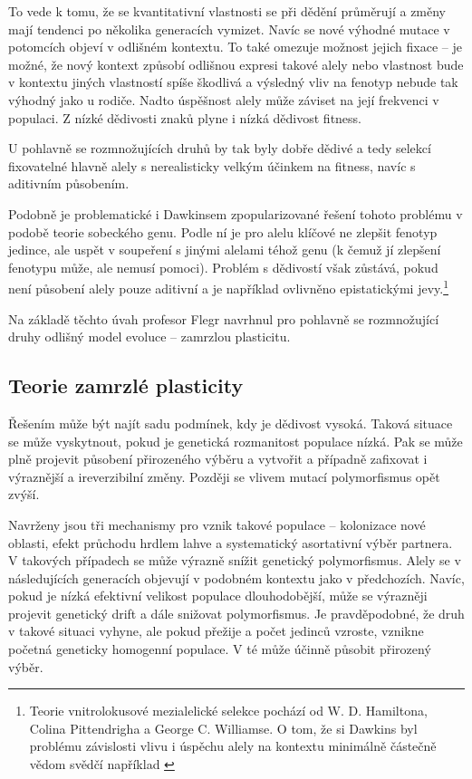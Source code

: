 To vede k tomu, že se kvantitativní vlastnosti se při dědění průměrují a změny mají tendenci po
několika generacích vymizet. Navíc se nové výhodné mutace v potomcích objeví v odlišném kontextu. To také
omezuje možnost jejich fixace -- je možné, že nový kontext způsobí odlišnou expresi takové alely nebo vlastnost bude
v kontextu jiných vlastností spíše škodlivá a výsledný vliv na fenotyp nebude tak výhodný jako u rodiče. Nadto
úspěšnost alely může záviset na její frekvenci v populaci. Z nízké dědivosti znaků plyne i nízká dědivost fitness.

U pohlavně se rozmnožujících druhů by tak byly dobře dědivé a tedy selekcí fixovatelné hlavně alely s nerealisticky
velkým účinkem na fitness, navíc s aditivním působením.

Podobně je problematické i Dawkinsem zpopularizované řešení tohoto problému v podobě teorie sobeckého genu.
Podle ní je pro alelu klíčové ne zlepšit fenotyp jedince, ale uspět v soupeření s jinými alelami téhož genu
(k čemuž jí zlepšení fenotypu může, ale nemusí pomoci). Problém s dědivostí však zůstává, pokud není působení
alely pouze aditivní a je například ovlivněno epistatickými jevy.\footnote{
Teorie vnitrolokusové mezialelické selekce pochází od W. D. Hamiltona, Colina Pittendrigha a George C. Williamse.
O tom, že si Dawkins byl problému závislosti vlivu i úspěchu alely na kontextu minimálně částečně vědom svědčí například
\citet[str. 231]{dawkins2003}
}

Na základě těchto úvah profesor Flegr navrhnul pro pohlavně se rozmnožující druhy odlišný model evoluce -- zamrzlou
plasticitu.

\subsection{Teorie zamrzlé plasticity}

Řešením může být najít sadu podmínek, kdy je dědivost vysoká. Taková situace se může vyskytnout, pokud je genetická
rozmanitost populace nízká. Pak se může plně projevit působení přirozeného výběru a vytvořit a případně zafixovat i
výraznější a ireverzibilní změny. Později se vlivem mutací polymorfismus opět zvýší.

Navrženy jsou tři mechanismy pro vznik takové populace -- kolonizace nové oblasti, efekt průchodu hrdlem lahve a
systematický asortativní výběr partnera. V takových případech se může výrazně snížit genetický polymorfismus. Alely
se v následujících generacích objevují v podobném kontextu jako v předchozích. Navíc, pokud je nízká efektivní
velikost populace dlouhodobější, může se výrazněji projevit genetický drift a dále snižovat polymorfismus. Je
pravděpodobné, že druh v takové situaci vyhyne, ale pokud přežije a počet jedinců vzroste, vznikne početná geneticky
homogenní populace. V té může účinně působit přirozený výběr.

